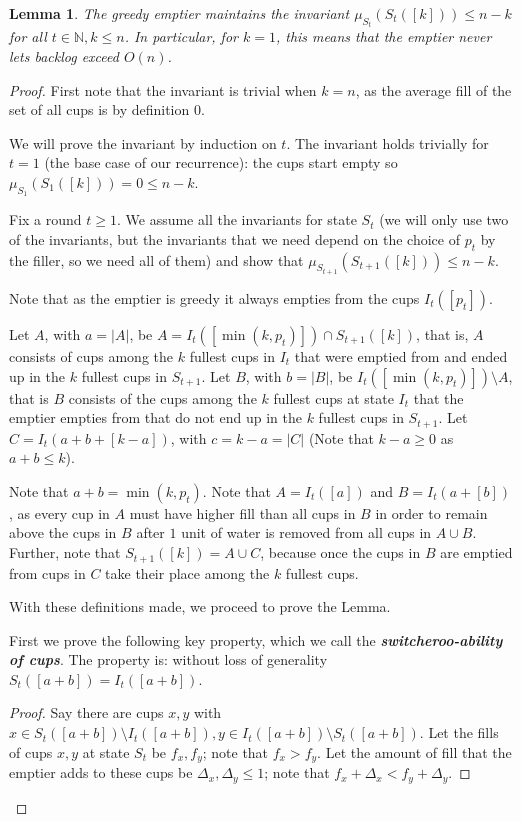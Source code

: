 \documentclass[twocolumn]{article}[11pt]
\newcommand{\defn}[1]{{\textit{\textbf{\boldmath #1}}}}
\newtheorem{lemma}{Lemma}
\begin{document}
\begin{lemma}
  The greedy emptier maintains the invariant $\mu_{S_t}(S_t([k])) \le n-k$ for
  all $t\in\mathbb{N}, k \le n$. In particular, for $k=1$, this means that the
  emptier never lets backlog exceed $O(n)$.
\end{lemma}
\begin{proof}
First note that the invariant is trivial when $k=n$, as the average fill of the
set of all cups is by definition $0$.

We will prove the invariant by induction on $t$.
The invariant holds trivially for $t=1$ (the base case of our recurrence): 
the cups start empty so $\mu_{S_1}(S_1([k])) = 0 \le n-k$.

Fix a round $t \ge 1$. We assume all the invariants for state $S_t$ (we will
only use two of the invariants, but the invariants that we need depend on the
choice of $p_t$ by the filler, so we need all of them) and show that
$\mu_{S_{t+1}}(S_{t+1}([k])) \le n-k$. 

Note that as the emptier is greedy it always empties from the cups $I_t([p_t])$.

Let $A$, with $a=|A|$, be $A = I_t([\min(k, p_t)]) \cap S_{t+1}([k])$, that is, $A$
consists of cups among the $k$ fullest cups in $I_t$ that were emptied from and
ended up in the $k$ fullest cups in $S_{t+1}$.
Let $B$, with $b=|B|$, be $I_t([\min(k, p_t)]) \setminus A$, that is $B$ consists of
the cups among the $k$ fullest cups at state $I_t$ that the emptier empties
from that do not end up in the $k$ fullest cups in $S_{t+1}$. 
Let $C = I_t(a+b+[k-a])$, with $c=k-a = |C|$ (Note that $k-a\ge 0$ as $a+b \le k$). 

Note that $a+ b = \min(k, p_t)$.
Note that $A = I_t([a])$ and $B = I_t(a+[b])$, as every cup in $A$
must have higher fill than all cups in $B$ in order to remain above the cups in
$B$ after $1$ unit of water is removed from all cups in $A\cup B$.
Further, note that $S_{t+1}([k]) = A \cup C$, because once the cups in $B$
are emptied from cups in $C$ take their place among the $k$ fullest cups.

With these definitions made, we proceed to prove the Lemma.

First we prove the following key property, which we call the \defn{switcheroo-ability of cups}.
The property is: without loss of generality $S_t([a+b]) = I_t([a+b])$.
\begin{proof}
  Say there are cups $x, y$ with $x\in S_t([a+b]) \setminus I_t([a+b]), y \in
  I_t([a+b])\setminus S_t([a+b])$. Let the fills of cups $x,y$ at state $S_t$
  be $f_x, f_y$; note that $f_x > f_y$. Let the amount of fill that the emptier
  adds to these cups be $\Delta_x, \Delta_y \le 1$; note that $f_x +\Delta_x <
  f_y + \Delta_y$.


\end{proof}
\end{proof}
\end{document}
